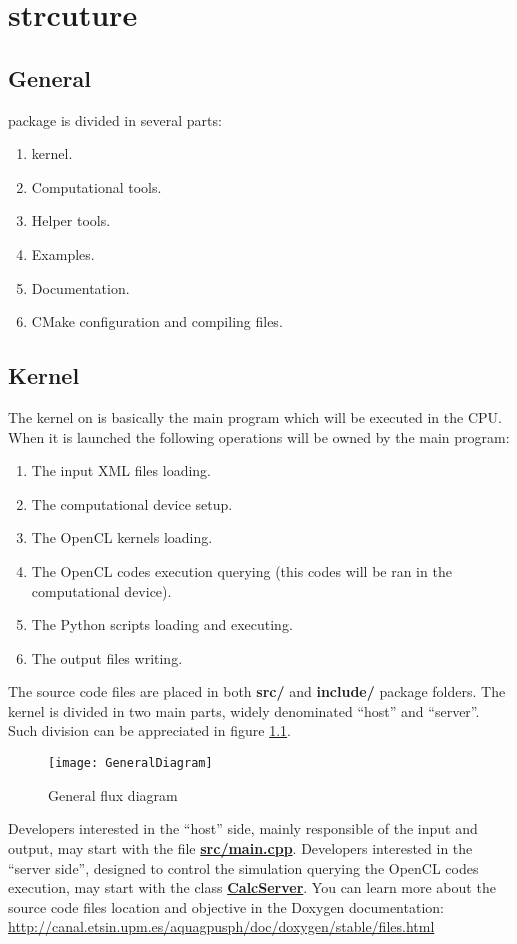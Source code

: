 \chapter{\NAME strcuture}
\label{s:structure}
%
\section{General}
\label{ss:structure::general}

\NAME package is divided in several parts:
%
\begin{enumerate}
	\item \NAME kernel.
	\item Computational tools.
	\item Helper tools.
	\item Examples.
	\item Documentation.
	\item CMake configuration and compiling files.
\end{enumerate}

\section{Kernel}
\label{ss:structure::kernel}
%
The kernel on \NAME is basically the main program which will be executed in the CPU.
%
When it is launched the following operations will be owned by the main program:
%
\begin{enumerate}
	\item The input XML files loading.
	\item The computational device setup.
	\item The OpenCL kernels loading.
	\item The OpenCL codes execution querying (this codes will be ran in the computational device).
	\item The Python scripts loading and executing.
	\item The output files writing.
\end{enumerate}
%
The source code files are placed in both \textbf{src/} and \textbf{include/} package folders.\rc
%
The kernel is divided in two main parts, widely denominated ``host'' and ``server''. Such division can be appreciated in figure \ref{fig:structure::kernel:generalDiagram}.
%
\begin{figure}[ht!]
  \centering
  \texttt{[image: GeneralDiagram]}
  \caption{General \NAME flux diagram}
  \label{fig:structure::kernel:generalDiagram}
\end{figure}
%
Developers interested in the ``host'' side, mainly responsible of the input and output, may start with the file \href{http://canal.etsin.upm.es/aquagpusph/doc/doxygen/stable/df/d0a/main_8cpp.html}{\textbf{src/main.cpp}}.\rc
%
Developers interested in the ``server side'', designed to control the simulation querying the OpenCL codes execution, may start with the class \href{http://canal.etsin.upm.es/aquagpusph/doc/doxygen/stable/dd/d66/classAqua_1_1CalcServer_1_1CalcServer.html}{\textbf{CalcServer}}.\rc
%
You can learn more about the source code files location and objective in the Doxygen documentation:\rc
%
\url{http://canal.etsin.upm.es/aquagpusph/doc/doxygen/stable/files.html}
%
